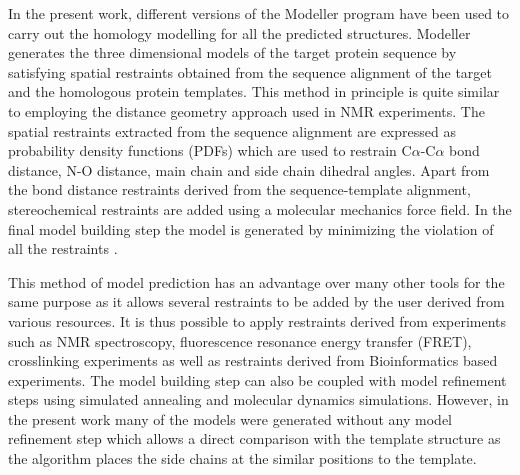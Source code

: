 		In the present work, different versions of the Modeller \Parencite{Sali1993} program have been used to carry out the homology modelling for all the predicted structures. Modeller generates the three dimensional models of the target protein sequence by satisfying spatial restraints obtained from the sequence alignment of the target and the homologous protein templates. This method in principle is quite similar to employing the distance geometry approach used in NMR experiments. The spatial restraints extracted from the sequence alignment are expressed as probability density functions (PDFs) which are used to restrain C$\alpha$-C$\alpha$ bond distance, N-O distance, main chain and side chain dihedral angles. Apart from the bond distance restraints derived from the sequence-template alignment, stereochemical restraints are added using a molecular mechanics force field. In the final model building step the model is generated by minimizing the violation of all the restraints \Parencite{Marti-Renom2000, Eswar2006}.
		
		This method of model prediction has an advantage over many other tools for the same purpose as it allows several restraints to be added by the user derived from various resources. It is thus possible to apply restraints derived from experiments such as NMR spectroscopy, fluorescence resonance energy transfer (FRET), crosslinking experiments as well as restraints derived from Bioinformatics based experiments. The model building step can also be coupled with model refinement steps using simulated annealing and molecular dynamics simulations. However, in the present work many of the models were generated without any model refinement step which allows a direct comparison with the template structure as the algorithm places the side chains at the similar positions to the template. %
		
